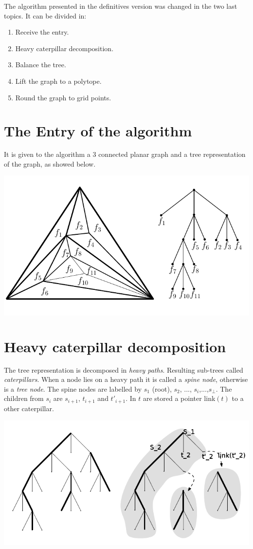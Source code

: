 \documentclass[10pt,a4paper]{article}
\begin{document}
The algorithm presented in the definitives version was changed in the two last topics. It can be divided in:

\begin{enumerate}
\item Receive the entry.
\item Heavy caterpillar decomposition.
\item Balance the tree.
\item Lift the graph to a polytope. 
\item Round the graph to grid points.
\end{enumerate}
 

\section{The Entry of the algorithm}

It is given to the algorithm a 3 connected planar graph and a tree representation of the graph, as showed below.

\includegraphics[scale=0.8]{graph_tree.png} 

\section{Heavy caterpillar decomposition}
The tree representation is decomposed in \textit{heavy paths}. Resulting sub-trees called \textit{caterpillars}. When a node lies on a heavy path it is called a \textit{spine node}, otherwise is a \textit{tree node}. The spine nodes are labelled by $s_1$ (root), $s_2$, ..., $s_i$,...,$s_\bot$. The children from $s_i$ are $s_{i+1}$, $t_{i+1}$ and $t'_{i+1}$. In $t$ are stored a pointer link$(t)$ to a other caterpillar. 

\includegraphics[scale=1]{caterpillarEdit.png} 
\end{document}
